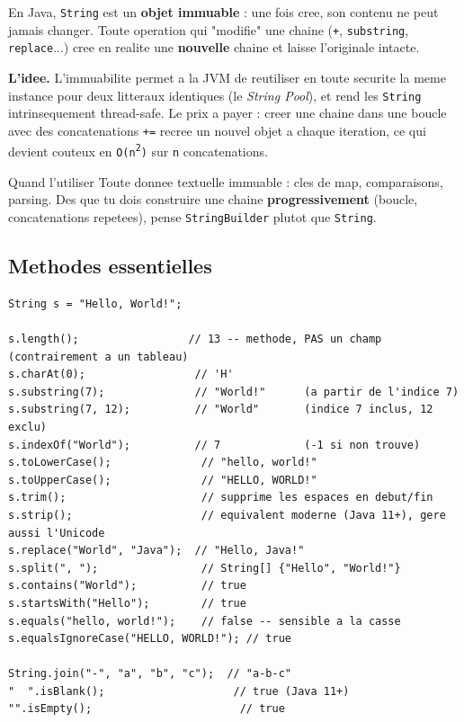 \documentclass[11pt,a4paper]{article}
\begin{document}
En Java, \texttt{String} est un \textbf{objet immuable} : une fois cree, son
contenu ne peut jamais changer. Toute operation qui "modifie" une chaine
(\texttt{+}, \texttt{substring}, \texttt{replace}...) cree en realite une
\textbf{nouvelle} chaine et laisse l'originale intacte.

\textbf{L'idee.} L'immuabilite permet a la JVM de reutiliser en toute securite
la meme instance pour deux litteraux identiques (le \emph{String Pool}), et
rend les \texttt{String} intrinsequement thread-safe. Le prix a payer : creer
une chaine dans une boucle avec des concatenations \texttt{+=} recree un
nouvel objet a chaque iteration, ce qui devient couteux en \texttt{O(n\textsuperscript{2})}
sur \texttt{n} concatenations.

\begin{infobox}{Quand l'utiliser}
Toute donnee textuelle immuable : cles de map, comparaisons, parsing.
Des que tu dois construire une chaine \textbf{progressivement} (boucle,
concatenations repetees), pense \texttt{StringBuilder} plutot que \texttt{String}.
\end{infobox}

\subsection{Methodes essentielles}

\begin{lstlisting}
String s = "Hello, World!";

s.length();                 // 13 -- methode, PAS un champ (contrairement a un tableau)
s.charAt(0);                 // 'H'
s.substring(7);              // "World!"      (a partir de l'indice 7)
s.substring(7, 12);          // "World"       (indice 7 inclus, 12 exclu)
s.indexOf("World");          // 7             (-1 si non trouve)
s.toLowerCase();              // "hello, world!"
s.toUpperCase();              // "HELLO, WORLD!"
s.trim();                     // supprime les espaces en debut/fin
s.strip();                    // equivalent moderne (Java 11+), gere aussi l'Unicode
s.replace("World", "Java");  // "Hello, Java!"
s.split(", ");                // String[] {"Hello", "World!"}
s.contains("World");          // true
s.startsWith("Hello");        // true
s.equals("hello, world!");    // false -- sensible a la casse
s.equalsIgnoreCase("HELLO, WORLD!"); // true

String.join("-", "a", "b", "c");  // "a-b-c"
"  ".isBlank();                    // true (Java 11+)
"".isEmpty();                       // true
\end{lstlisting}
\end{document}
